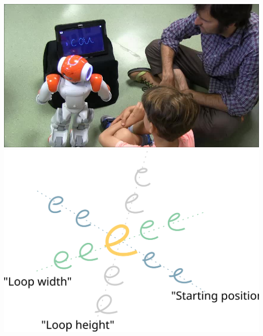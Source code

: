 \documentclass[xcolor=table]{beamer}
\begin{document}
\begin{frame}{}
            \hyperlink{cellulo}{\includegraphics[height=0.2\paperheight]{cowriter/cowriter-session1_3minExcerpt_1x_thumb}}
            \hspace{0.5em}
            \hyperlink{cowriter-impl}{\includegraphics[height=0.2\paperheight]{cowriter/pca}}


\end{frame}
\end{document}
